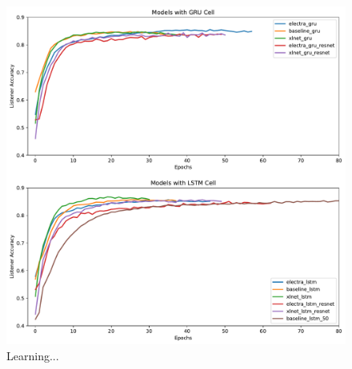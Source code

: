 \begin{figure}[ht]
\centering
\includegraphics[width=\textwidth]{assets/learning.pdf}
\caption[Learning]
{Learning...}
\label{figure:learning}
\end{figure}




